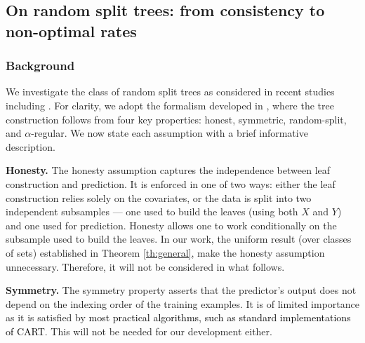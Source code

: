 \documentclass[paper=a4, fontsize=11pt]{scrartcl}
\newtheorem{definition}[theorem]{Definition}
\newcommand{\rev}[1]{\textcolor{black}{#1}}
\begin{document}
\subsection{On random split trees: from  consistency to non-optimal rates}\label{sec_wag}

\subsubsection{Background}

We investigate the class of random split trees as considered in recent studies including \cite{meinshausen2006quantile,biau2012analysis,wager2018estimation}. For clarity, we adopt the formalism developed in \cite{wager2018estimation}, %
where the tree construction follows from four key properties: honest, symmetric, random-split, and $\alpha$-regular.
We now state each assumption with a brief informative description. 

\noindent \textbf{Honesty.} The {honesty} assumption captures the independence between leaf construction and prediction. It is enforced in one of two ways: either the leaf construction relies solely on the covariates, or the data is split into two independent subsamples — one used to build the leaves (using both $X$
 and $Y$) and one used for prediction. Honesty allows one to work conditionally on the subsample used to build the leaves. In our work, the uniform result (over classes of sets) established in Theorem \ref{th:general}, make the honesty assumption unnecessary. Therefore, it will not be considered in what follows.

\noindent \textbf{Symmetry.} The symmetry property asserts that  the predictor's output does not depend on the indexing order of the training examples. It is of limited importance as it is satisfied by \rev{most practical algorithms, such as standard implementations of CART}. This will not be needed for our development either.
\end{document}

